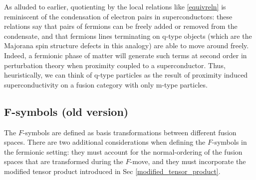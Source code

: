 \documentclass[12pt,a4paper]{article}
\begin{document}
As alluded to earlier, quotienting by the local relations like \eqref{equivreln} is reminiscent of the 
condensation of electron pairs in superconductors: these relations say that pairs of fermions can be freely 
added or removed from the condensate, and that fermions lines terminating on q-type objects (which are 
the Majorana spin structure defects in this analogy) are able to move around freely. 
Indeed, a fermionic phase of matter will generate such terms at second order in perturbation theory when 
proximity coupled to a superconductor.
Thus, heuristically, we can think of q-type particles as the result of proximity induced superconductivity on 
a fusion category with only m-type particles.


\subsection{F-symbols (old version)}

The $F$-symbols are defined as basis transformations between different fusion spaces. 
There are two additional considerations when defining the $F$-symbols in the fermionic setting: they must account for the normal-ordering of the fusion spaces that are transformed during the $F$-move, and they must incorporate the modified tensor product introduced in Sec \ref{modified_tensor_product}. 
\end{document}
